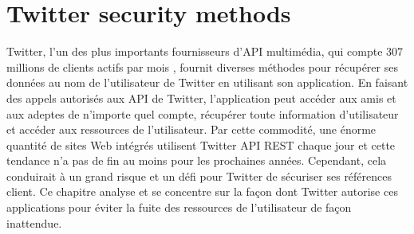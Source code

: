 \chapter{Twitter security methods}
Twitter, l'un des plus importants fournisseurs d'API multimédia, qui compte 307 millions de clients actifs par mois \cite{17}, fournit diverses méthodes pour récupérer ses données au nom de l'utilisateur de Twitter en utilisant son application. En faisant des appels autorisés aux API de Twitter, l'application peut accéder aux amis et aux adeptes de n'importe quel compte, récupérer toute information d'utilisateur et accéder aux ressources de l'utilisateur. Par cette commodité, une énorme quantité de sites Web intégrés utilisent Twitter API REST chaque jour et cette tendance n'a pas de fin au moins pour les prochaines années. Cependant, cela conduirait à un grand risque et un défi pour Twitter de sécuriser ses références client. Ce chapitre analyse et se concentre sur la façon dont Twitter autorise ces applications pour éviter la fuite des ressources de l'utilisateur de façon inattendue.
